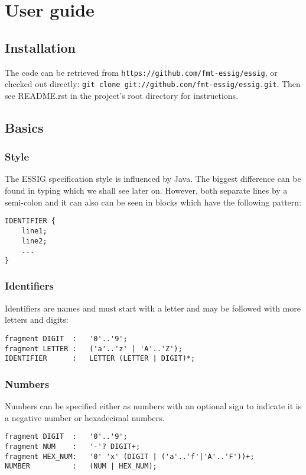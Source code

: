 \chapter{User guide}


\section{Installation}
The code can be retrieved from \texttt{https://github.com/fmt-essig/essig}, or
checked out directly: \texttt{git clone git://github.com/fmt-essig/essig.git}.
Then see README.rst in the project's root directory for instructions.

\section{Basics}
\subsection{Style}
The \ac{ESSIG} specification style is influenced by Java. The biggest
difference can be found in typing which we shall see later on. However, both
separate lines by a semi-colon and it can also can be seen in blocks which have
the following pattern:

\lstset{caption=Block specification pattern}
\begin{lstlisting}
IDENTIFIER {
	line1;
	line2;
	...
}
\end{lstlisting}


\subsection[IDENTIFIER]{Identifiers}
Identifiers are names and must start with a letter and may be followed with
more letters and digits:

\lstset{caption=Identifier specifation}
\begin{lstlisting}
fragment DIGIT	:	'0'..'9';
fragment LETTER	:	('a'..'z' | 'A'..'Z');
IDENTIFIER		:	LETTER (LETTER | DIGIT)*;
\end{lstlisting}

\subsection{Numbers}
Numbers can be specified either as numbers with an optional sign to indicate it
is a negative number or hexadecimal numbers.

\lstset{caption=Number specifation}
\begin{lstlisting}
fragment DIGIT	:	'0'..'9';
fragment NUM	:	'-'? DIGIT+;
fragment HEX_NUM:	'0' 'x' (DIGIT | ('a'..'f'|'A'..'F'))+;
NUMBER			:	(NUM | HEX_NUM);
\end{lstlisting}

